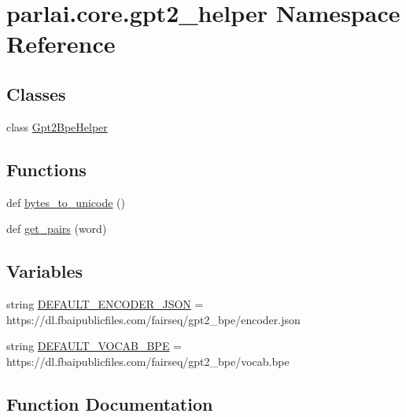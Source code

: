 \hypertarget{namespaceparlai_1_1core_1_1gpt2__helper}{}\section{parlai.\+core.\+gpt2\+\_\+helper Namespace Reference}
\label{namespaceparlai_1_1core_1_1gpt2__helper}
\subsection*{Classes}
\begin{DoxyCompactItemize}
\item 
class \hyperlink{classparlai_1_1core_1_1gpt2__helper_1_1Gpt2BpeHelper}{Gpt2\+Bpe\+Helper}
\end{DoxyCompactItemize}
\subsection*{Functions}
\begin{DoxyCompactItemize}
\item 
def \hyperlink{namespaceparlai_1_1core_1_1gpt2__helper_ae992d8ce81708900b1b1bb81bc7a816d}{bytes\+\_\+to\+\_\+unicode} ()
\item 
def \hyperlink{namespaceparlai_1_1core_1_1gpt2__helper_ac5bffa2aece99e43444185ba85dff425}{get\+\_\+pairs} (word)
\end{DoxyCompactItemize}
\subsection*{Variables}
\begin{DoxyCompactItemize}
\item 
string \hyperlink{namespaceparlai_1_1core_1_1gpt2__helper_aeb53e5722eee3791e6921df0a571263c}{D\+E\+F\+A\+U\+L\+T\+\_\+\+E\+N\+C\+O\+D\+E\+R\+\_\+\+J\+S\+ON} = \textquotesingle{}https\+://dl.\+fbaipublicfiles.\+com/fairseq/gpt2\+\_\+bpe/encoder.\+json\textquotesingle{}
\item 
string \hyperlink{namespaceparlai_1_1core_1_1gpt2__helper_a45a1fe95a0d4df46ca148fef2a20ebd1}{D\+E\+F\+A\+U\+L\+T\+\_\+\+V\+O\+C\+A\+B\+\_\+\+B\+PE} = \textquotesingle{}https\+://dl.\+fbaipublicfiles.\+com/fairseq/gpt2\+\_\+bpe/vocab.\+bpe\textquotesingle{}
\end{DoxyCompactItemize}


\subsection{Function Documentation}
\mbox{\label{namespaceparlai_1_1core_1_1gpt2__helper_ae992d8ce81708900b1b1bb81bc7a816d}} 
